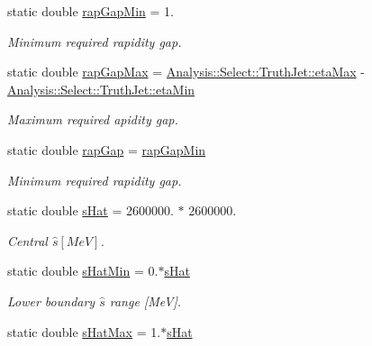 \begin{DoxyCompactItemize}
\item 
static double \hyperlink{namespaceAnalysis_1_1Select_1_1Event_a7b2bce93ace6ef0368b6e38ccd809ed0}{rap\+Gap\+Min} = 1.
\begin{DoxyCompactList}\small\item\em Minimum required rapidity gap. \end{DoxyCompactList}\item 
static double \hyperlink{namespaceAnalysis_1_1Select_1_1Event_a46517b487f23e3507e9b714039ead277}{rap\+Gap\+Max} = \hyperlink{namespaceAnalysis_1_1Select_1_1TruthJet_a667ad09951ba9ba785549ec2e4a10770}{Analysis\+::\+Select\+::\+Truth\+Jet\+::eta\+Max} -\/ \hyperlink{namespaceAnalysis_1_1Select_1_1TruthJet_a37b231bdadb05d096c3542de8387283f}{Analysis\+::\+Select\+::\+Truth\+Jet\+::eta\+Min}
\begin{DoxyCompactList}\small\item\em Maximum required apidity gap. \end{DoxyCompactList}\item 
static double \hyperlink{namespaceAnalysis_1_1Select_1_1Event_a5be60eaed61b702f72c99039d08478bd}{rap\+Gap} = \hyperlink{namespaceAnalysis_1_1Select_1_1Event_a7b2bce93ace6ef0368b6e38ccd809ed0}{rap\+Gap\+Min}
\begin{DoxyCompactList}\small\item\em Minimum required rapidity gap. \end{DoxyCompactList}\item 
static double \hyperlink{namespaceAnalysis_1_1Select_1_1Event_ae9452563af166c95dc76ce45889435a1}{s\+Hat} = 2600000. $\ast$ 2600000.
\begin{DoxyCompactList}\small\item\em Central $ \hat{s} [MeV] $. \end{DoxyCompactList}\item 
static double \hyperlink{namespaceAnalysis_1_1Select_1_1Event_afc8b09ec51a480d59ceb969a6e984788}{s\+Hat\+Min} = 0.$\ast$\hyperlink{namespaceAnalysis_1_1Select_1_1Event_ae9452563af166c95dc76ce45889435a1}{s\+Hat}
\begin{DoxyCompactList}\small\item\em Lower boundary $ \hat{s} $ range \mbox{[}MeV\mbox{]}. \end{DoxyCompactList}\item 
static double \hyperlink{namespaceAnalysis_1_1Select_1_1Event_a5a398a3f4f0590598003266da5bb6d9f}{s\+Hat\+Max} = 1.$\ast$\hyperlink{namespaceAnalysis_1_1Select_1_1Event_ae9452563af166c95dc76ce45889435a1}{s\+Hat}

\end{DoxyCompactItemize}
